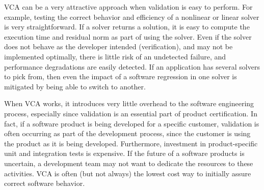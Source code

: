 \documentclass[11pt]{SANDreport}
\begin{document}
VCA can be a very attractive approach when validation is easy to perform.  For example, testing the correct behavior and efficiency of a nonlinear or linear solver is very straightforward.  If a solver returns a solution, it is easy to compute the execution time and residual norm as part of using the solver.  Even if the solver does not behave as the developer intended (verification), and may not be implemented optimally, there is little risk of an undetected failure, and performance degradations are easily detected.   If an application has several solvers to pick from, then even the impact of a software regression in one solver is mitigated by being able to switch to another. 

When VCA works, it introduces very little overhead to the software engineering process, especially since validation is an essential part of product certification.  In fact, if a software product is being developed for a specific customer, validation is often occurring as part of the development process, since the customer is using the product as it is being developed.  Furthermore, investment in product-specific unit and integration tests is expensive.  If the future of a software products is uncertain, a development team may not want to dedicate the resources to these activities.  VCA is often (but not always) the lowest cost way to initially assure correct software behavior.
\end{document}
